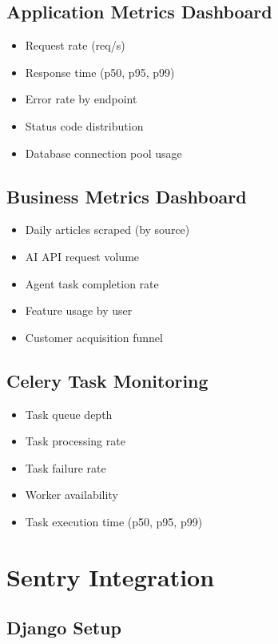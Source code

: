 \documentclass{report}
\begin{document}
\subsection{Application Metrics Dashboard}

\begin{itemize}
  \item Request rate (req/s)
  \item Response time (p50, p95, p99)
  \item Error rate by endpoint
  \item Status code distribution
  \item Database connection pool usage
\end{itemize}

\subsection{Business Metrics Dashboard}

\begin{itemize}
  \item Daily articles scraped (by source)
  \item AI API request volume
  \item Agent task completion rate
  \item Feature usage by user
  \item Customer acquisition funnel
\end{itemize}

\subsection{Celery Task Monitoring}

\begin{itemize}
  \item Task queue depth
  \item Task processing rate
  \item Task failure rate
  \item Worker availability
  \item Task execution time (p50, p95, p99)
\end{itemize}

\section{Sentry Integration}

\subsection{Django Setup}
\end{document}
